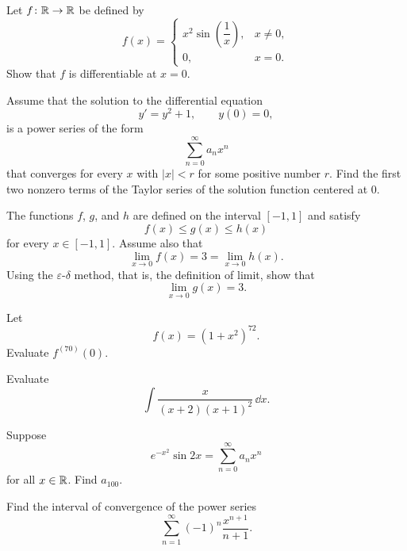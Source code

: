 \begin{problem}
Let $f\colon\mathbb{R}\to\mathbb{R}$ be defined by
\[
f(x)=
\begin{cases}
x^2\sin\!\left(\dfrac{1}{x}\right), & x\ne0,\\[0.6em]
0, & x=0.
\end{cases}
\]
Show that $f$ is differentiable at $x=0$.
\end{problem}

\begin{problem}
Assume that the solution to the differential equation
\[
y'=y^2+1,
\qquad
y(0)=0,
\]
is a power series of the form
\[
\sum_{n=0}^{\infty}a_nx^n
\]
that converges for every $x$ with $|x|<r$ for some positive number $r$. Find the first two nonzero terms of the Taylor series of the solution function centered at $0$.
\end{problem}

\begin{problem}
The functions $f$, $g$, and $h$ are defined on the interval $[-1,1]$ and satisfy
\[
f(x)\le g(x)\le h(x)
\]
for every $x\in[-1,1]$. Assume also that
\[
\lim_{x\to0}f(x)=3=\lim_{x\to0}h(x).
\]
Using the $\varepsilon$-$\delta$ method, that is, the definition of limit, show that
\[
\lim_{x\to0}g(x)=3.
\]
\end{problem}

\begin{problem}
Let
\[
f(x)=(1+x^2)^{72}.
\]
Evaluate $f^{(70)}(0)$.
\end{problem}

\begin{problem}
Evaluate
\[
\int \frac{x}{(x+2)(x+1)^2}\,\dd x.
\]
\end{problem}

\begin{problem}
Suppose
\[
e^{-x^2}\sin 2x=\sum_{n=0}^{\infty}a_nx^n
\]
for all $x\in\mathbb{R}$. Find $a_{100}$.
\end{problem}

\begin{problem}
Find the interval of convergence of the power series
\[
\sum_{n=1}^{\infty}(-1)^n\frac{x^{n+1}}{n+1}.
\]
\end{problem}

